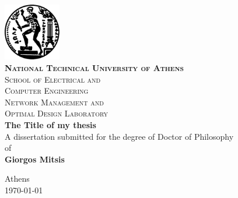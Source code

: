 \begin{titlepage}
  \centering
  \includegraphics[width=2.5cm, height=2.5cm]{figures/preamble/pyrforos.pdf}\\
  \Large{\textbf{\textsc{National Technical University of Athens}}}\\
  \vspace{0.15cm}
  \large{\textsc{School of Electrical and \\
    Computer Engineering}}\\
  \vspace{0.15cm}
  \large{\textsc{Network Management and\\
    Optimal Design Laboratory}}\\
  \vspace{4cm}
  \Large{\textbf{The Title of my thesis}}\\
  \vspace{4cm}
  \normalsize{A dissertation submitted for the degree of Doctor of Philosophy}\\
  \vspace{0.2cm}
  \normalsize{of}\\
  \vspace{0.2cm}
  \large{\textbf{Giorgos Mitsis}}\\

	\vfill
	{\large Athens\\\today\par}
\end{titlepage}

\blankpage

